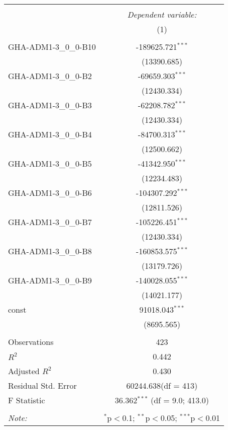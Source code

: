 \begin{table}[!htbp] \centering
\begin{tabular}{@{\extracolsep{5pt}}lc}
\\[-1.8ex]\hline
\hline \\[-1.8ex]
& \multicolumn{1}{c}{\textit{Dependent variable:}} \
\cr \cline{1-2}
\\[-1.8ex] & (1) \\
\hline \\[-1.8ex]
 GHA-ADM1-3_0_0-B10 & -189625.721$^{***}$ \\
  & (13390.685) \\
 GHA-ADM1-3_0_0-B2 & -69659.303$^{***}$ \\
  & (12430.334) \\
 GHA-ADM1-3_0_0-B3 & -62208.782$^{***}$ \\
  & (12430.334) \\
 GHA-ADM1-3_0_0-B4 & -84700.313$^{***}$ \\
  & (12500.662) \\
 GHA-ADM1-3_0_0-B5 & -41342.950$^{***}$ \\
  & (12234.483) \\
 GHA-ADM1-3_0_0-B6 & -104307.292$^{***}$ \\
  & (12811.526) \\
 GHA-ADM1-3_0_0-B7 & -105226.451$^{***}$ \\
  & (12430.334) \\
 GHA-ADM1-3_0_0-B8 & -160853.575$^{***}$ \\
  & (13179.726) \\
 GHA-ADM1-3_0_0-B9 & -140028.055$^{***}$ \\
  & (14021.177) \\
 const & 91018.043$^{***}$ \\
  & (8695.565) \\
\hline \\[-1.8ex]
 Observations & 423 \\
 $R^2$ & 0.442 \\
 Adjusted $R^2$ & 0.430 \\
 Residual Std. Error & 60244.638(df = 413)  \\
 F Statistic & 36.362$^{***}$ (df = 9.0; 413.0) \\
\hline
\hline \\[-1.8ex]
\textit{Note:} & \multicolumn{1}{r}{$^{*}$p$<$0.1; $^{**}$p$<$0.05; $^{***}$p$<$0.01} \\
\end{tabular}
\end{table}